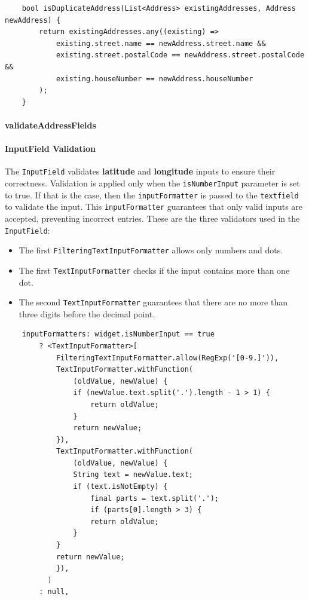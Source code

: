 \lstset{style=mycsharp, caption=isDuplicateAddress method}
\begin{lstlisting}
    bool isDuplicateAddress(List<Address> existingAddresses, Address newAddress) {
        return existingAddresses.any((existing) =>
            existing.street.name == newAddress.street.name &&
            existing.street.postalCode == newAddress.street.postalCode &&
            existing.houseNumber == newAddress.houseNumber
        );
    }
\end{lstlisting}

\paragraph{validateAddressFields}



\paragraph{InputField Validation}
The \texttt{InputField} validates \textbf{latitude} and \textbf{longitude} inputs to ensure their correctness. Validation is applied only when the \texttt{isNumberInput} parameter is set to true. If that is the case, then the \texttt{inputFormatter} is passed to the \texttt{textfield} to validate the input. This \texttt{inputFormatter} guarantees that only valid inputs are accepted, preventing incorrect entries. These are the three validators used in the \texttt{InputField}:


\begin{itemize}
    \item The first \texttt{FilteringTextInputFormatter} allows only numbers and dots.
    \item The first \texttt{TextInputFormatter} checks if the input contains more than one dot.
    \item The second \texttt{TextInputFormatter} guarantees that there are no more than three digits before the decimal point.
\end{itemize}


\lstset{style=mycsharp, caption=InputFormatter in Inputfield}
\begin{lstlisting}
    inputFormatters: widget.isNumberInput == true
        ? <TextInputFormatter>[
            FilteringTextInputFormatter.allow(RegExp('[0-9.]')),
            TextInputFormatter.withFunction(
                (oldValue, newValue) {
                if (newValue.text.split('.').length - 1 > 1) {
                    return oldValue;
                }
                return newValue;
            }),
            TextInputFormatter.withFunction(
                (oldValue, newValue) {
                String text = newValue.text;
                if (text.isNotEmpty) {
                    final parts = text.split('.');
                    if (parts[0].length > 3) {
                    return oldValue;
                }
            }
            return newValue;
            }),
          ]
        : null,
\end{lstlisting}




